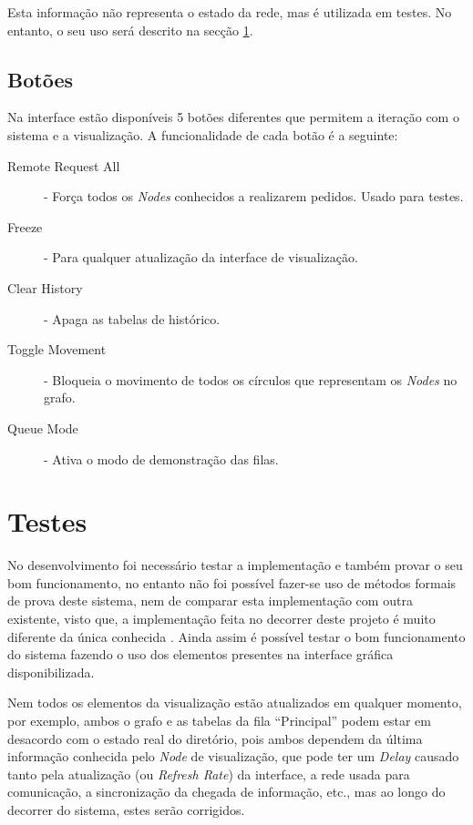 Esta informação não representa o estado da rede, mas é utilizada em testes. No entanto, o seu uso será descrito na secção \ref{validacao:sec:testes}.

\subsection*{Botões}
Na interface estão disponíveis 5 botões diferentes que permitem a iteração com o sistema e a visualização. A funcionalidade de cada botão é a seguinte:
\begin{description}
    \item [Remote Request All] - Força todos os \emph{Nodes} conhecidos a realizarem pedidos. Usado para testes.
    \item [Freeze] - Para qualquer atualização da interface de visualização.
    \item [Clear History] - Apaga as tabelas de histórico.
    \item [Toggle Movement] - Bloqueia o movimento de todos os círculos que representam os \emph{Nodes} no grafo.
    \item [Queue Mode] - Ativa o modo de demonstração das filas.

\end{description}

\section{Testes}
\label{validacao:sec:testes}
No desenvolvimento foi necessário testar a implementação e também provar o seu bom funcionamento, no entanto não foi possível fazer-se uso de métodos formais de prova deste sistema, nem de comparar esta implementação com outra existente, visto que, a implementação feita no decorrer deste projeto é muito diferente da única conhecida \cite{aleph}.
Ainda assim é possível testar o bom funcionamento do sistema fazendo o uso dos elementos presentes na interface gráfica disponibilizada.

Nem todos os elementos da visualização estão atualizados em qualquer momento, por exemplo, ambos o grafo e as tabelas da fila ``Principal'' podem estar em desacordo com o estado real do diretório, pois ambos dependem da última informação conhecida pelo \emph{Node} de visualização, que pode ter um \emph{Delay} causado tanto pela atualização (ou \emph{Refresh Rate}) da interface, a rede usada para comunicação, a sincronização da chegada de informação, etc., mas ao longo do decorrer do sistema, estes serão corrigidos.



